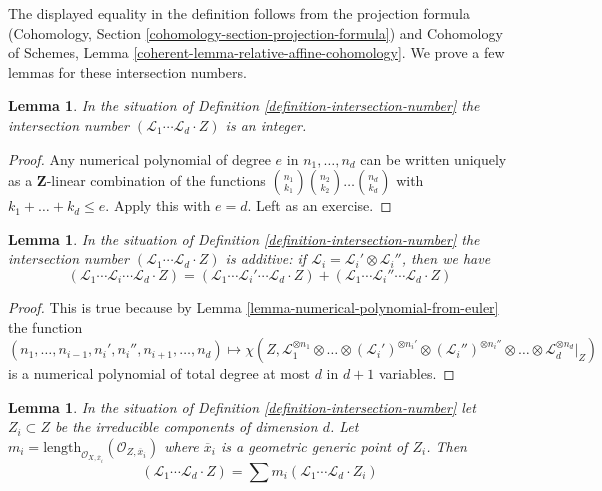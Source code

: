 \documentclass{stacks-project}
\theoremstyle{plain}
\newtheorem{lemma}[subsection]{Lemma}
\theoremstyle{definition}
\theoremstyle{remark}
\numberwithin{equation}{subsection}
\begin{document}
\noindent
The displayed equality in the definition follows from
the projection formula
(Cohomology, Section \ref{cohomology-section-projection-formula}) and
Cohomology of Schemes, Lemma
\ref{coherent-lemma-relative-affine-cohomology}.
We prove a few lemmas for these intersection numbers.

\begin{lemma}
\label{lemma-intersection-number-integer}
In the situation of Definition \ref{definition-intersection-number}
the intersection number
$(\mathcal{L}_1 \cdots \mathcal{L}_d \cdot Z)$
is an integer.
\end{lemma}

\begin{proof}
Any numerical polynomial of degree $e$ in $n_1, \ldots, n_d$ can be
written uniquely as a $\mathbf{Z}$-linear combination of the functions
${n_1 \choose k_1}{n_2 \choose k_2} \ldots {n_d \choose k_d}$ with
$k_1 + \ldots + k_d \leq e$. Apply this with $e = d$.
Left as an exercise.
\end{proof}

\begin{lemma}
\label{lemma-intersection-number-additive}
In the situation of Definition \ref{definition-intersection-number}
the intersection number
$(\mathcal{L}_1 \cdots \mathcal{L}_d \cdot Z)$
is additive: if $\mathcal{L}_i = \mathcal{L}_i' \otimes \mathcal{L}_i''$,
then we have
$$
(\mathcal{L}_1 \cdots \mathcal{L}_i \cdots \mathcal{L}_d \cdot Z) =
(\mathcal{L}_1 \cdots \mathcal{L}_i' \cdots \mathcal{L}_d \cdot Z) +
(\mathcal{L}_1 \cdots \mathcal{L}_i'' \cdots \mathcal{L}_d \cdot Z)
$$
\end{lemma}

\begin{proof}
This is true because by Lemma \ref{lemma-numerical-polynomial-from-euler}
the function
$$
(n_1, \ldots, n_{i - 1}, n_i', n_i'', n_{i + 1}, \ldots, n_d)
\mapsto
\chi(Z, \mathcal{L}_1^{\otimes n_1} \otimes
\ldots \otimes (\mathcal{L}_i')^{\otimes n_i'} \otimes
(\mathcal{L}_i'')^{\otimes n_i''} \otimes \ldots \otimes
\mathcal{L}_d^{\otimes n_d}|_Z)
$$
is a numerical polynomial of total degree at most $d$ in $d + 1$ variables.
\end{proof}

\begin{lemma}
\label{lemma-intersection-number-in-terms-of-components}
In the situation of Definition \ref{definition-intersection-number}
let $Z_i \subset Z$ be the irreducible components of dimension $d$. Let
$m_i = \text{length}_{\mathcal{O}_{X, \overline{x}_i}}
(\mathcal{O}_{Z, \overline{x}_i})$
where $\overline{x}_i$ is a geometric generic point of $Z_i$. Then
$$
(\mathcal{L}_1 \cdots \mathcal{L}_d \cdot Z) =
\sum m_i(\mathcal{L}_1 \cdots \mathcal{L}_d \cdot Z_i)
$$
\end{lemma}
\end{document}
